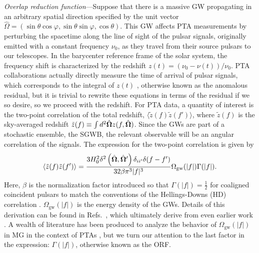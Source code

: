 \documentclass[prd,twocolumn,aps,psfig,nofootinbib,nobibnotes,superscriptaddress,preprintnumbers,times]{revtex4-2}
\begin{document}
\textit{Overlap reduction function}---Suppose that there is a massive GW propagating in an arbitrary spatial direction specified by the unit vector $\hat{\Omega} = (\sin\theta \cos\varphi,
                        \sin\theta \sin\varphi,
                        \cos\theta)$.
This GW affects PTA measurements by perturbing the spacetime along the line of sight of the pulsar signals, originally emitted with a constant frequency $\nu_0$, as they travel from their source pulsars to our telescopes. In the barycenter reference frame of the solar system, the frequency shift is characterized by the redshift $z(t) = (\nu_0 - \nu(t))/\nu_0$. PTA collaborations actually directly measure the time of arrival of pulsar signals, which corresponds to the integral of $z(t)$ \cite{Anholm:2008wy, Dahal:2020}, otherwise known as the anomalous residual, but it is trivial to rewrite these equations in terms of the residual if we so desire, so we
proceed with the redshift. For PTA data, a quantity of interest is the two-point correlation of the total redshift, $\langle \tilde{z}(f) \tilde{z}(f') \rangle$, where $\tilde{z}(f)$ is the sky-averaged redshift $\tilde{z}(f) \equiv \int d^2\hat{\bf \Omega} z(f, \hat{\bf \Omega})$. Since the GWs are part of a stochastic ensemble, the SGWB, the relevant observable will be an angular correlation of the signals. The expression for the two-point correlation is given by \cite{Liang:2021bct, Anholm:2008wy}
\begin{equation}\label{eqn:two_point_z}
    \langle \tilde{z}(f) \tilde{z}(f') \rangle = \frac{3H_0^2\delta^2\left(\hat{\bf \Omega} , \hat{\bf \Omega}'\right)\delta_{ii'}\delta(f - f')}{32 \beta \pi^3|f|^3}\Omega_{\text{gw}}(|f|) \Gamma(|f|).
\end{equation}
Here, $\beta$ is the normalization factor introduced so that $\Gamma(|f|) = \frac{1}{2}$ for coaligned coincident pulsars to match the conventions of the Hellings-Downs (HD) correlation \cite{Romano:2023zhb}. $\Omega_{\text{gw}}(|f|)$ is the energy density of the GWs. Details of this derivation can be found in Refs.~\cite{Anholm:2008wy, Liang:2021bct}, which ultimately derive from even earlier work \cite{Detweiler:1979wn, Estabrook:1975jtn, Kaufmann:1970}. A wealth of literature has been produced to analyze the behavior of $\Omega_{\text{gw}}(|f|)$ in MG in the context of PTAs \cite{Choi:2023tun, Wu:2023rib, Kenjale:2024rsc, He:2021bqm}, but we turn our attention to the last factor in the expression: $\Gamma(|f|)$, otherwise known as the ORF. 
\end{document}
